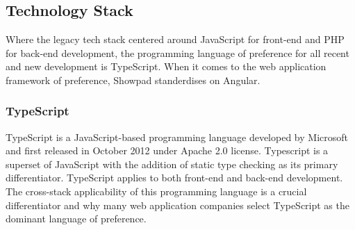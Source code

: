 \chapter{}
\label{ch:stand-van-zaken}





\section{Technology Stack}
\label{sec:techstack}
Where the legacy tech stack centered around JavaScript for front-end and PHP for back-end development, the programming language of preference for all recent and new development is TypeScript. When it comes to the web application framework of preference, Showpad standerdises on  Angular.  
\subsection{TypeScript}
TypeScript is a JavaScript-based programming language developed by Microsoft and first released in October 2012 under Apache 2.0 license. Typescript is a superset of JavaScript with the addition of static type checking as its primary differentiator. TypeScript applies to both front-end and back-end development. The cross-stack applicability of this programming language is a crucial differentiator and why many web application companies select TypeScript as the dominant language of preference. 
